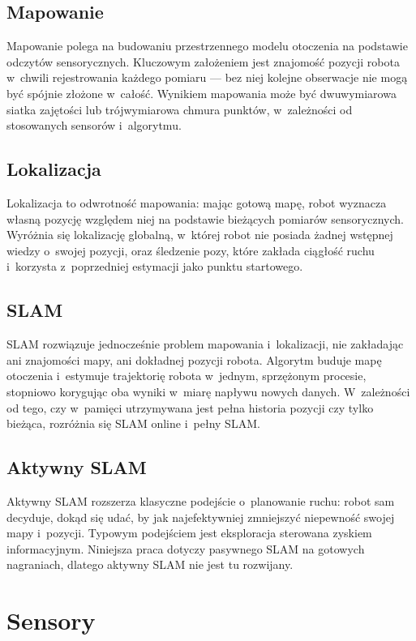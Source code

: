 \subsection{Mapowanie}

Mapowanie polega na budowaniu przestrzennego modelu otoczenia na podstawie
odczytów sensorycznych.
Kluczowym założeniem jest znajomość pozycji robota w~chwili rejestrowania
każdego pomiaru --- bez niej kolejne obserwacje nie mogą być spójnie złożone
w~całość.
Wynikiem mapowania może być dwuwymiarowa siatka zajętości lub trójwymiarowa
chmura punktów, w~zależności od stosowanych sensorów i~algorytmu.

\subsection{Lokalizacja}

Lokalizacja to odwrotność mapowania: mając gotową mapę, robot wyznacza
własną pozycję względem niej na podstawie bieżących pomiarów sensorycznych.
Wyróżnia się lokalizację globalną, w~której robot nie posiada żadnej
wstępnej wiedzy o~swojej pozycji, oraz śledzenie pozy, które zakłada
ciągłość ruchu i~korzysta z~poprzedniej estymacji jako punktu startowego.

\subsection{SLAM}

SLAM rozwiązuje jednocześnie problem mapowania i~lokalizacji, nie zakładając
ani znajomości mapy, ani dokładnej pozycji robota.
Algorytm buduje mapę otoczenia i~estymuje trajektorię robota w~jednym,
sprzężonym procesie, stopniowo korygując oba wyniki w~miarę napływu
nowych danych.
W~zależności od tego, czy w~pamięci utrzymywana jest pełna historia pozycji
czy tylko bieżąca, rozróżnia się SLAM online i~pełny SLAM.

\subsection{Aktywny SLAM}

Aktywny SLAM rozszerza klasyczne podejście o~planowanie ruchu: robot sam
decyduje, dokąd się udać, by jak najefektywniej zmniejszyć niepewność
swojej mapy i~pozycji.
Typowym podejściem jest eksploracja sterowana zyskiem informacyjnym.
Niniejsza praca dotyczy pasywnego SLAM na gotowych nagraniach,
dlatego aktywny SLAM nie jest tu rozwijany.

\section{Sensory}

